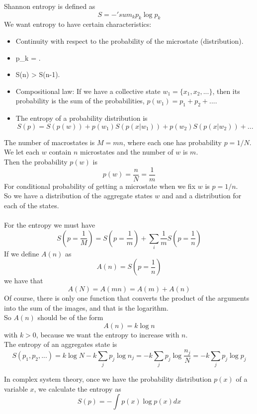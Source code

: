 Shannon entropy is defined as
$$
	S = -'sum_k p_k\log p_k
$$
We want entropy to have certain characteristics:
\begin{itemize}
	\item Continuity with respect to the probability of the microstate (distribution). 
	\item p_k = .
	\item S(n) > S(n-1).
	\item Compositional law: If we have a collective state $w_1 = \{x_1,x_2,...\}$, then its probability is the sum of the probabilities, $p(w_1) = p_1 + p_2 + ...$.
	\item The entropy of a probability distribution is
$$
	S(p) = S(p(w)) + p(w_1)S(p(x|w_1)) + p(w_2)S(p(x|w_2)) + ...
$$
\end{itemize}

The number of macrostates is $M=mn$, where each one has probability $p=1/N$. \\
We let each $w$ contain $n$ microstates and the number of $w$ is $m$. \\
Then the probability $p(w)$ is
$$
	p(w) = \frac{n}{N} = \frac{1}{m}
$$
For conditional probability of getting a microstate when we fix $w$ is $p=1/n$. \\
So we have a distribution of the aggregate states $w$ and and a distribution for each of the states. \\ \\
For the entropy we must have
$$
	S(p=\frac{1}{M}) = S(p=\frac{1}{m}) + \sum_i \frac{1}{m}S(p=\frac{1}{n})
$$
If	 we define $A(n)$ as
$$
	A(n) = S(p=\frac{1}{n})
$$
we have that
$$
	A(N) = A(mn) = A(m) + A(n)
$$
Of course, there is only one function that converts the product of the arguments into the sum of the images, and that is the logarithm. \\
So $A(n)$ should be of the form
$$
	A(n) = k\log n
$$
with $k>0$, because we want the entropy to increase with $n$. \\
The entropy of an aggregates state is
$$
	S(p_1,p_2,...) = k\log N -k\sum_j p_j \log n_j
						= -k\sum_j p_j \log \frac{n_j}{N}
						= -k\sum_j p_j \log p_j
$$	


In complex system theory, once we have the probability distribution $p(x)$ of a variable $x$, we calculate the entropy as
$$
	S(p) = -\int p(x)\log p(x) dx
$$



